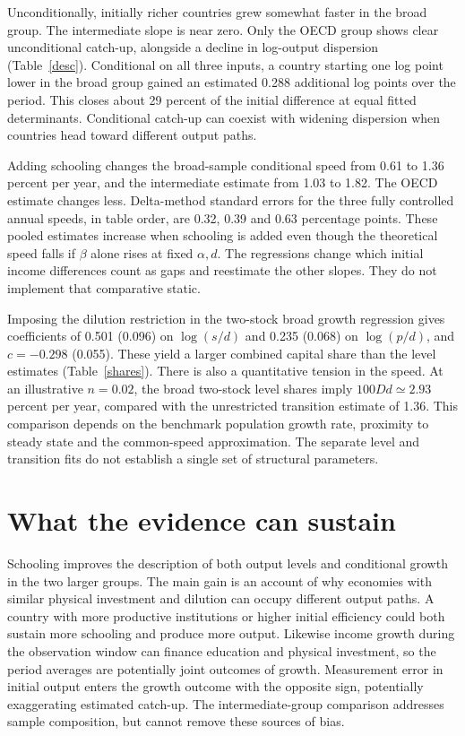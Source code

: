 \documentclass[11pt]{article}
\begin{document}
Unconditionally, initially richer countries grew somewhat faster in the broad group. The intermediate slope is near zero. Only the OECD group shows clear unconditional catch-up, alongside a decline in log-output dispersion (Table~\ref{desc}). Conditional on all three inputs, a country starting one log point lower in the broad group gained an estimated 0.288 additional log points over the period. This closes about 29 percent of the initial difference at equal fitted determinants. Conditional catch-up can coexist with widening dispersion when countries head toward different output paths.

Adding schooling changes the broad-sample conditional speed from 0.61 to 1.36 percent per year, and the intermediate estimate from 1.03 to 1.82. The OECD estimate changes less. Delta-method standard errors for the three fully controlled annual speeds, in table order, are 0.32, 0.39 and 0.63 percentage points. These pooled estimates increase when schooling is added even though the theoretical speed falls if $\beta$ alone rises at fixed $\alpha,d$. The regressions change which initial income differences count as gaps and reestimate the other slopes. They do not implement that comparative static.

Imposing the dilution restriction in the two-stock broad growth regression gives coefficients of 0.501 (0.096) on $\log(s/d)$ and 0.235 (0.068) on $\log(p/d)$, and $c=-0.298$ (0.055). These yield a larger combined capital share than the level estimates (Table~\ref{shares}). There is also a quantitative tension in the speed. At an illustrative $n=0.02$, the broad two-stock level shares imply $100Dd\simeq2.93$ percent per year, compared with the unrestricted transition estimate of 1.36. This comparison depends on the benchmark population growth rate, proximity to steady state and the common-speed approximation. The separate level and transition fits do not establish a single set of structural parameters.

\section{What the evidence can sustain}
Schooling improves the description of both output levels and conditional growth in the two larger groups. The main gain is an account of why economies with similar physical investment and dilution can occupy different output paths. A country with more productive institutions or higher initial efficiency could both sustain more schooling and produce more output. Likewise income growth during the observation window can finance education and physical investment, so the period averages are potentially joint outcomes of growth. Measurement error in initial output enters the growth outcome with the opposite sign, potentially exaggerating estimated catch-up. The intermediate-group comparison addresses sample composition, but cannot remove these sources of bias.
\end{document}
